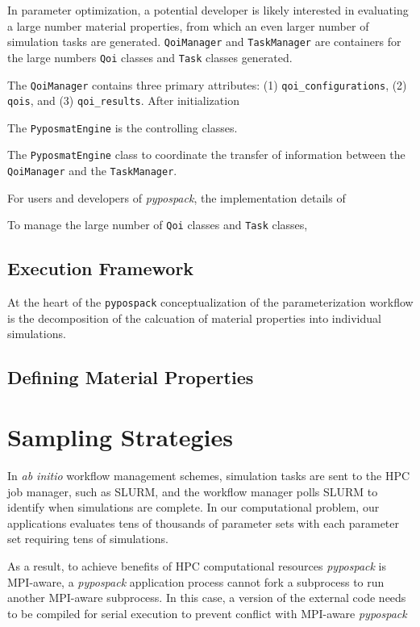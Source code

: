 In parameter optimization, a potential developer is likely interested in evaluating a large number material properties, from which an even larger number of simulation tasks are generated.  \verb|QoiManager| and \verb|TaskManager| are containers for the large numbers \verb|Qoi| classes and \verb|Task| classes generated.

The \verb|QoiManager| contains three primary attributes: (1) \verb|qoi_configurations|, (2) \verb|qois|, and (3) \verb|qoi_results|.  After initialization

The \verb|PyposmatEngine| is the controlling classes.




The \verb|PyposmatEngine| class to coordinate the transfer of information between the \verb|QoiManager| and the \verb|TaskManager|.



For users and developers of \emph{pypospack}, the implementation details of







To manage the large number of \verb|Qoi| classes and \verb|Task| classes,

\subsection{Execution Framework}
At the heart of the \verb|pypospack| conceptualization of the parameterization workflow is the decomposition of the calcuation of material properties into individual simulations.


\subsection{Defining Material Properties}

\section{Sampling Strategies}
\label{sec:software_sampling_strategies}

In \emph{ab initio} workflow management schemes, simulation tasks are sent to the HPC job manager, such as SLURM, and the workflow manager polls SLURM to identify when simulations are complete.  In our computational problem, our applications evaluates tens of thousands of parameter sets with each parameter set requiring tens of simulations.

As a result, to achieve benefits of HPC computational resources \emph{pypospack} is MPI-aware, a \emph{pypospack} application process cannot fork a subprocess to run another MPI-aware subprocess.  In this case, a version of the external code needs to be compiled for serial execution to prevent conflict with MPI-aware \emph{pypospack}

